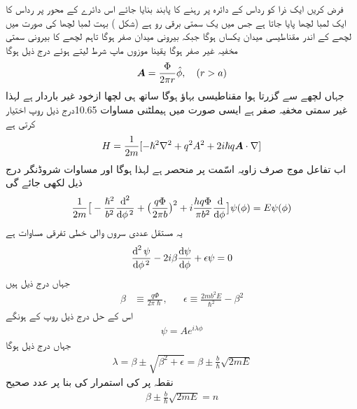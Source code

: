  فرض کریں ایک ذرا کو رداس  کے دائرہ پر رہنے کا پابند بنایا جائے اس دائرے کے محور پر رداس  کا ایک لمبا لچھا پایا جاتا ہے جس میں یک سمتی برقی رو  ہے  (شکل  )   بہت لمبا لچھا کی صورت میں لچھے کے اندر مقناطیسی میدان یکساں ہوگا جبکہ بیرونی میدان صفر ہوگا تاہم لچھے کا بیرونی سمتی مخفیہ غیر صفر ہوگا یقینا موزوں ماپ شرط  لیتے ہوئے درج ذیل ہوگا 
\begin{align}
{\ensuremath{{\boldsymbol{A}}}} = \frac{\Phi}{2\pi r} \hat{\phi}, \quad (r > a)
\end{align}
جہاں  لچھے سے گزرتا ہوا  مقناطیسی بہاؤ ہوگا ساتھ ہی لچھا ازخود غیر باردار ہے لہذا غیر سمتی مخفیہ  صفر ہے ایسی صورت میں ہیملٹنی مساوات 10.65درج ذیل روپ اختیار کرتی ہے 
\begin{align}
H = \frac{1}{2m} [- \hslash^2 \nabla^2 + q^2 A^2 + 2 i \hslash q {{\boldsymbol{A}}} \cdot \nabla]
\end{align}
اب تفاعل موج صرف زاویہ اسّمت  پر منحصر ہے لہذا  ہوگا اور مساوات شروڈنگر درج ذیل لکھی جائے گی 
\begin{align}
\frac{1}{2m} \big [ - \frac{\hslash^2}{b^2} \frac{\dif^{\,2}}{\dif \phi^{\,2}} + \big ( \frac{q \Phi}{2 \pi b} \big )^2 + i \frac{h q \Phi}{\pi b^2} \frac{\dif}{\dif \phi} \big ] \psi (\phi) = E \psi (\phi)
\end{align}
یہ مستقل عددی سروں والی خطی تفرقی مساوات ہے
\begin{align}
\frac{\dif^{\,2} \psi}{\dif \phi^{\,2}} - 2i \beta \frac{\dif \psi}{\dif \phi} + \epsilon \psi = 0
\end{align}
جہاں درج ذیل ہیں
\begin{align}
\beta &\equiv \frac{q \Phi}{2 \pi \hslash}, && \epsilon \equiv \frac{2 m b ^2 E}{\hslash^2} - \beta^2
\end{align}
اس کے حل درج ذیل روپ کے ہونگے 
\begin{align}
\psi = Ae^{i \lambda \phi}
\end{align}
جہاں درج ذیل ہوگا 
\begin{align}
\lambda = \beta \pm \sqrt{ \beta^2 + \epsilon} = \beta \pm \frac{b}{\hslash} \sqrt{2 m E}
\end{align}
نقطہ  پر  کی استمرار کی بنا پر  عدد صحیح
\begin{align}
\beta \pm \frac{b}{\hslash} \sqrt{2m E} = n
\end{align} 
